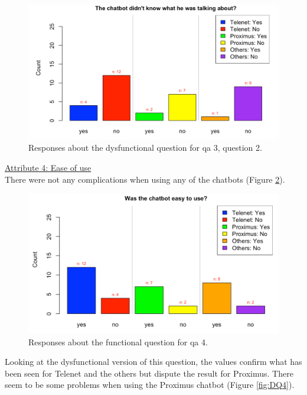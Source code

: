 \begin{figure}[!htb]
	\includegraphics[width=\linewidth, scale=0.5]{../LaTeX/Figures/Comparative/DQ3.png}
	\caption{Responses about the dysfunctional question for \acrshort{qa} 3, question 2.}\label{fig:DQ3b}
\end{figure}
\break 
\ul{Attribute 4: Ease of use}\\
\break
There were not any complications when using any of the chatbots (Figure \ref{fig:Q4}).
\begin{figure}[!htb]
	\includegraphics[width=\linewidth, scale=0.5]{../LaTeX/Figures/Comparative/Q4.png}
	\caption{Responses about the functional question for \acrshort{qa} 4.}\label{fig:Q4}
\end{figure}
Looking at the dysfunctional version of this question, the values confirm what has been seen for Telenet and the others but dispute the result for Proximus. There seem to be some problems when using the Proximus chatbot (Figure \ref{fig:DQ4}).\\

